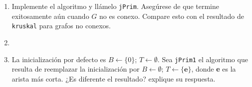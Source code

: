 \documentclass{amsart}
\begin{document}
\begin{large}
\begin{enumerate}
    \item Implemente el algoritmo y llámelo \texttt{jPrim}. Asegúrese de que termine exitosamente aún cuando $G$ no es conexo. Compare esto con el resultado de \texttt{kruskal} para grafos no conexos.
    \item[] 
    \item La inicialización por defecto es $B \leftarrow \{0\}$; $T \leftarrow \emptyset$. Sea \texttt{jPrim1} el algoritmo que resulta de reemplazar la inicialización por $B \leftarrow \emptyset$; $T \leftarrow \{\mathbf{e}\}$, donde \textbf{e} es la arista más corta. ¿Es diferente el resultado? explique su respuesta.
\end{enumerate}

\end{large}
\end{document}
